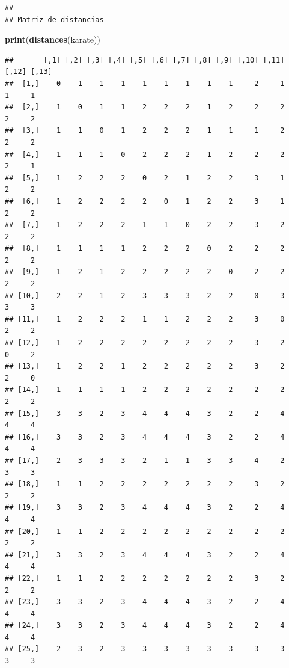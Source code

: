 \documentclass[
]{article}
\newenvironment{Shaded}{\begin{snugshade}}{\end{snugshade}}
\newcommand{\FunctionTok}[1]{\textcolor[rgb]{0.13,0.29,0.53}{\textbf{#1}}}
\newcommand{\NormalTok}[1]{#1}
\begin{document}
\begin{verbatim}
## 
## Matriz de distancias
\end{verbatim}

\begin{Shaded}
\begin{Highlighting}[]
\FunctionTok{print}\NormalTok{(}\FunctionTok{distances}\NormalTok{(karate))}
\end{Highlighting}
\end{Shaded}

\begin{verbatim}
##       [,1] [,2] [,3] [,4] [,5] [,6] [,7] [,8] [,9] [,10] [,11] [,12] [,13]
##  [1,]    0    1    1    1    1    1    1    1    1     2     1     1     1
##  [2,]    1    0    1    1    2    2    2    1    2     2     2     2     2
##  [3,]    1    1    0    1    2    2    2    1    1     1     2     2     2
##  [4,]    1    1    1    0    2    2    2    1    2     2     2     2     1
##  [5,]    1    2    2    2    0    2    1    2    2     3     1     2     2
##  [6,]    1    2    2    2    2    0    1    2    2     3     1     2     2
##  [7,]    1    2    2    2    1    1    0    2    2     3     2     2     2
##  [8,]    1    1    1    1    2    2    2    0    2     2     2     2     2
##  [9,]    1    2    1    2    2    2    2    2    0     2     2     2     2
## [10,]    2    2    1    2    3    3    3    2    2     0     3     3     3
## [11,]    1    2    2    2    1    1    2    2    2     3     0     2     2
## [12,]    1    2    2    2    2    2    2    2    2     3     2     0     2
## [13,]    1    2    2    1    2    2    2    2    2     3     2     2     0
## [14,]    1    1    1    1    2    2    2    2    2     2     2     2     2
## [15,]    3    3    2    3    4    4    4    3    2     2     4     4     4
## [16,]    3    3    2    3    4    4    4    3    2     2     4     4     4
## [17,]    2    3    3    3    2    1    1    3    3     4     2     3     3
## [18,]    1    1    2    2    2    2    2    2    2     3     2     2     2
## [19,]    3    3    2    3    4    4    4    3    2     2     4     4     4
## [20,]    1    1    2    2    2    2    2    2    2     2     2     2     2
## [21,]    3    3    2    3    4    4    4    3    2     2     4     4     4
## [22,]    1    1    2    2    2    2    2    2    2     3     2     2     2
## [23,]    3    3    2    3    4    4    4    3    2     2     4     4     4
## [24,]    3    3    2    3    4    4    4    3    2     2     4     4     4
## [25,]    2    3    2    3    3    3    3    3    3     3     3     3     3

\end{verbatim}
\end{document}
